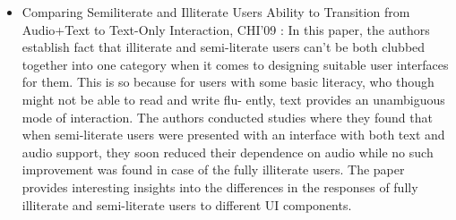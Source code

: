 \begin{itemize}
\item Comparing Semiliterate and Illiterate Users Ability to Transition from Audio+Text
to Text-Only Interaction, CHI’09 \cite{findlater2009comparing} : In this paper, the authors establish fact that
illiterate and semi-literate users can’t be both clubbed together into one category
when it comes to designing suitable user interfaces for them. This is so because for
users with some basic literacy, who though might not be able to read and write flu-
ently, text provides an unambiguous mode of interaction. The authors conducted
studies where they found that when semi-literate users were presented with an
interface with both text and audio support, they soon reduced their dependence
on audio while no such improvement was found in case of the fully illiterate users.
The paper provides interesting insights into the differences in the responses of fully
illiterate and semi-literate users to different UI components.
\end{itemize}

